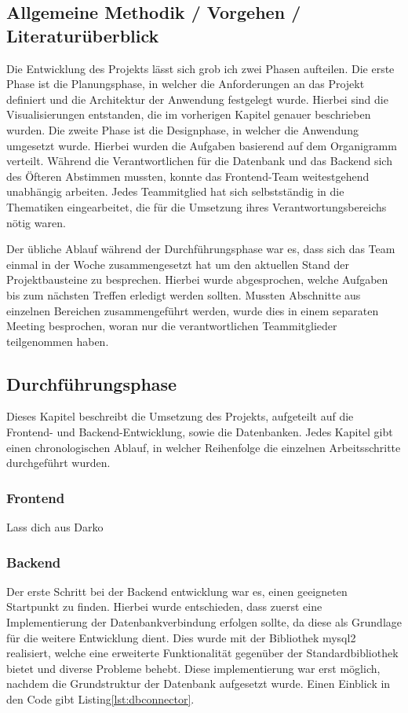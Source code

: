 \subsection{Allgemeine Methodik / Vorgehen / Literaturüberblick}\label{subsec:Methodik}
Die Entwicklung des Projekts lässt sich grob ich zwei Phasen aufteilen.
Die erste Phase ist die Planungsphase, in welcher die Anforderungen an das Projekt definiert und die Architektur der Anwendung festgelegt wurde.
Hierbei sind die Visualisierungen entstanden, die im vorherigen Kapitel genauer beschrieben wurden.
Die zweite Phase ist die Designphase, in welcher die Anwendung umgesetzt wurde.
Hierbei wurden die Aufgaben basierend auf dem Organigramm verteilt.
Während die Verantwortlichen für die Datenbank und das Backend sich des Öfteren Abstimmen mussten, konnte das Frontend-Team weitestgehend unabhängig arbeiten.
Jedes Teammitglied hat sich selbstständig in die Thematiken eingearbeitet, die für die Umsetzung ihres Verantwortungsbereichs nötig waren.

Der übliche Ablauf während der Durchführungsphase war es, dass sich das Team einmal in der Woche zusammengesetzt hat um den aktuellen Stand der Projektbausteine zu besprechen.
Hierbei wurde abgesprochen, welche Aufgaben bis zum nächsten Treffen erledigt werden sollten.
Mussten Abschnitte aus einzelnen Bereichen zusammengeführt werden, wurde dies in einem separaten Meeting besprochen, woran nur die verantwortlichen Teammitglieder teilgenommen haben.

\subsection{Durchführungsphase}\label{subsec:Durchführungsphase}
Dieses Kapitel beschreibt die Umsetzung des Projekts, aufgeteilt auf die Frontend- und Backend-Entwicklung, sowie die Datenbanken.
Jedes Kapitel gibt einen chronologischen Ablauf, in welcher Reihenfolge die einzelnen Arbeitsschritte durchgeführt wurden.

\subsubsection{Frontend}\label{subsubsec:Frontend}
Lass dich aus Darko

\subsubsection{Backend}
Der erste Schritt bei der Backend entwicklung war es, einen geeigneten Startpunkt zu finden.
Hierbei wurde entschieden, dass zuerst eine Implementierung der Datenbankverbindung erfolgen sollte, da diese als Grundlage für die weitere Entwicklung dient.
Dies wurde mit der Bibliothek mysql2 realisiert, welche eine erweiterte Funktionalität gegenüber der Standardbibliothek bietet und diverse Probleme behebt.
Diese implementierung war erst möglich, nachdem die Grundstruktur der Datenbank aufgesetzt wurde.
Einen Einblick in den Code gibt Listing\ref{lst:dbconnector}.

